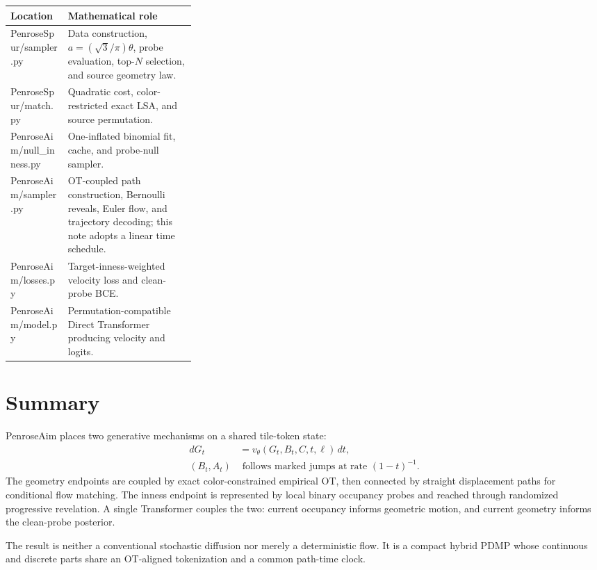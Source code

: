 \documentclass[11pt]{article}
\newcommand{\1}{\mathbf{1}}
\begin{document}
\begin{tabularx}{\linewidth}{@{}>{\ttfamily}p{0.31\linewidth}X@{}}
\toprule
\normalfont\textbf{Location} & \textbf{Mathematical role}\\
\midrule
PenroseSpur/sampler.py &
Data construction, \(a=(\sqrt3/\pi)\theta\), probe evaluation, top-\(N\)
selection, and source geometry law.\\
PenroseSpur/match.py &
Quadratic cost, color-restricted exact LSA, and source permutation.\\
PenroseAim/null\_inness.py &
One-inflated binomial fit, cache, and probe-null sampler.\\
PenroseAim/sampler.py &
OT-coupled path construction, Bernoulli reveals, Euler flow, and trajectory
decoding; this note adopts a linear time schedule.\\
PenroseAim/losses.py &
Target-inness-weighted velocity loss and clean-probe BCE.\\
PenroseAim/model.py &
Permutation-compatible Direct Transformer producing velocity and logits.\\
\bottomrule
\end{tabularx}

\section{Summary}

PenroseAim places two generative mechanisms on a shared tile-token state:
\[
\boxed{
\begin{aligned}
  dG_t &= v_\theta(G_t,B_t,C,t,\ell)\,dt,\\
  (B_t,A_t) &\text{ follows marked jumps at rate }(1-t)^{-1}.
\end{aligned}}
\]
The geometry endpoints are coupled by exact color-constrained empirical OT,
then connected by straight displacement paths for conditional flow matching.
The inness endpoint is represented by local binary occupancy probes and
reached through randomized progressive revelation.  A single Transformer
couples the two: current occupancy informs geometric motion, and current
geometry informs the clean-probe posterior.

The result is neither a conventional stochastic diffusion nor merely a
deterministic flow.  It is a compact hybrid PDMP whose continuous and discrete
parts share an OT-aligned tokenization and a common path-time clock.
\end{document}
